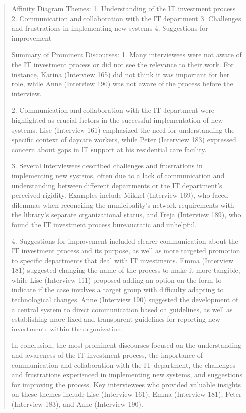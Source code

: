 \documentclass[
]{book}
\begin{document}
\begin{quote}
Affinity Diagram Themes: 1. Understanding of the IT investment process 2. Communication and collaboration with the IT department 3. Challenges and frustrations in implementing new systems 4. Suggestions for improvement

Summary of Prominent Discourses: 1. Many interviewees were not aware of the IT investment process or did not see the relevance to their work. For instance, Karina (Interview 165) did not think it was important for her role, while Anne (Interview 190) was not aware of the process before the interview.

2. Communication and collaboration with the IT department were highlighted as crucial factors in the successful implementation of new systems. Lise (Interview 161) emphasized the need for understanding the specific context of daycare workers, while Peter (Interview 183) expressed concern about gaps in IT support at his residential care facility.

3. Several interviewees described challenges and frustrations in implementing new systems, often due to a lack of communication and understanding between different departments or the IT department's perceived rigidity. Examples include Mikkel (Interview 169), who faced dilemmas when reconciling the municipality's network requirements with the library's separate organizational status, and Freja (Interview 189), who found the IT investment process bureaucratic and unhelpful.

4. Suggestions for improvement included clearer communication about the IT investment process and its purpose, as well as more targeted promotion to specific departments that deal with IT investments. Emma (Interview 181) suggested changing the name of the process to make it more tangible, while Lise (Interview 161) proposed adding an option on the form to indicate if the case involves a target group with difficulty adapting to technological changes. Anne (Interview 190) suggested the development of a central system to direct communication based on guidelines, as well as establishing more fixed and transparent guidelines for reporting new investments within the organization.

In conclusion, the most prominent discourses focused on the understanding and awareness of the IT investment process, the importance of communication and collaboration with the IT department, the challenges and frustrations experienced in implementing new systems, and suggestions for improving the process. Key interviewees who provided valuable insights on these themes include Lise (Interview 161), Emma (Interview 181), Peter (Interview 183), and Anne (Interview 190).
\end{quote}
\end{document}
